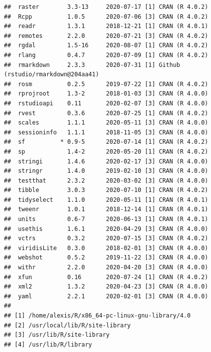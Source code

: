 \documentclass[
  french,
]{book}
\begin{document}
\begin{verbatim}
##  raster        3.3-13     2020-07-17 [1] CRAN (R 4.0.2)                    
##  Rcpp          1.0.5      2020-07-06 [3] CRAN (R 4.0.2)                    
##  readr         1.3.1      2018-12-21 [1] CRAN (R 4.0.1)                    
##  remotes       2.2.0      2020-07-21 [3] CRAN (R 4.0.2)                    
##  rgdal         1.5-16     2020-08-07 [1] CRAN (R 4.0.2)                    
##  rlang         0.4.7      2020-07-09 [1] CRAN (R 4.0.2)                    
##  rmarkdown     2.3.3      2020-07-31 [1] Github (rstudio/rmarkdown@204aa41)
##  rosm          0.2.5      2019-07-22 [1] CRAN (R 4.0.2)                    
##  rprojroot     1.3-2      2018-01-03 [3] CRAN (R 4.0.0)                    
##  rstudioapi    0.11       2020-02-07 [3] CRAN (R 4.0.0)                    
##  rvest         0.3.6      2020-07-25 [1] CRAN (R 4.0.2)                    
##  scales        1.1.1      2020-05-11 [3] CRAN (R 4.0.0)                    
##  sessioninfo   1.1.1      2018-11-05 [3] CRAN (R 4.0.0)                    
##  sf          * 0.9-5      2020-07-14 [1] CRAN (R 4.0.2)                    
##  sp            1.4-2      2020-05-20 [1] CRAN (R 4.0.2)                    
##  stringi       1.4.6      2020-02-17 [3] CRAN (R 4.0.0)                    
##  stringr       1.4.0      2019-02-10 [3] CRAN (R 4.0.0)                    
##  testthat      2.3.2      2020-03-02 [3] CRAN (R 4.0.0)                    
##  tibble        3.0.3      2020-07-10 [1] CRAN (R 4.0.2)                    
##  tidyselect    1.1.0      2020-05-11 [1] CRAN (R 4.0.1)                    
##  tweenr        1.0.1      2018-12-14 [1] CRAN (R 4.0.1)                    
##  units         0.6-7      2020-06-13 [1] CRAN (R 4.0.1)                    
##  usethis       1.6.1      2020-04-29 [3] CRAN (R 4.0.0)                    
##  vctrs         0.3.2      2020-07-15 [3] CRAN (R 4.0.2)                    
##  viridisLite   0.3.0      2018-02-01 [3] CRAN (R 4.0.0)                    
##  webshot       0.5.2      2019-11-22 [3] CRAN (R 4.0.0)                    
##  withr         2.2.0      2020-04-20 [3] CRAN (R 4.0.0)                    
##  xfun          0.16       2020-07-24 [1] CRAN (R 4.0.2)                    
##  xml2          1.3.2      2020-04-23 [3] CRAN (R 4.0.0)                    
##  yaml          2.2.1      2020-02-01 [3] CRAN (R 4.0.0)                    
## 
## [1] /home/alexis/R/x86_64-pc-linux-gnu-library/4.0
## [2] /usr/local/lib/R/site-library
## [3] /usr/lib/R/site-library
## [4] /usr/lib/R/library
\end{verbatim}

  
\end{document}
